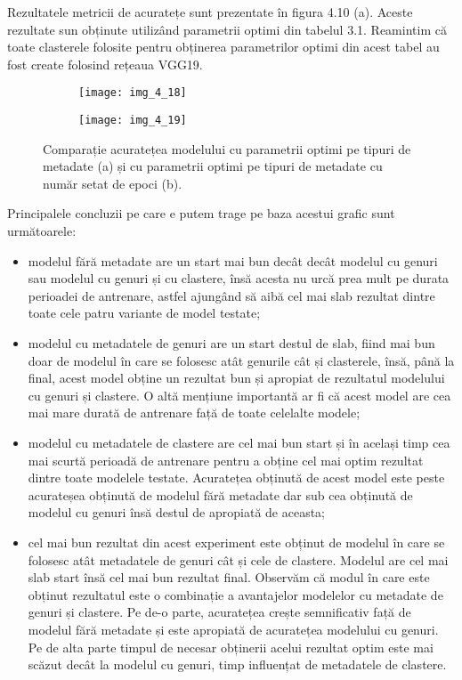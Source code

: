 Rezultatele metricii de acuratețe sunt prezentate în figura 4.10 (a). Aceste rezultate sun obținute utilizând parametrii optimi din tabelul 3.1. Reamintim că toate clasterele folosite pentru obținerea parametrilor optimi din acest tabel au fost create folosind rețeaua VGG19.
\begin{figure}[!tbp]
  \begin{subfigure}[b]{0.5\textwidth}
    \texttt{[image: img\_4\_18]}
    \caption{}
    \label{fig:f1}
  \end{subfigure}
  \hfill
  \begin{subfigure}[b]{0.5\textwidth}
    \texttt{[image: img\_4\_19]}
    \caption{}
    \label{fig:f2}
  \end{subfigure}
  \caption[Comparație acuratețea modelului cu parametrii optimi pe tipuri de metadate]{Comparație acuratețea modelului cu parametrii optimi pe tipuri de metadate (a) și cu parametrii optimi pe tipuri de metadate cu număr setat de epoci (b).}
\end{figure}
Principalele concluzii pe care e putem trage pe baza acestui grafic sunt următoarele:
\begin{itemize}
	\item modelul fără metadate are un start mai bun decât decât modelul cu genuri sau modelul cu genuri și cu clastere, însă acesta nu urcă prea mult pe durata perioadei de antrenare, astfel ajungând să aibă cel mai slab rezultat dintre toate cele patru variante de model testate;
	\item modelul cu metadatele de genuri are un start destul de slab, fiind mai bun doar de modelul în care se folosesc atât genurile cât și clasterele, însă, până la final, acest model obține un rezultat bun și apropiat de rezultatul modelului cu genuri și clastere. O altă mențiune importantă ar fi că acest model are cea mai mare durată de antrenare față de toate celelalte modele;
	\item modelul cu metadatele de clastere are cel mai bun start și în același timp cea mai scurtă perioadă de antrenare pentru a obține cel mai optim rezultat dintre toate modelele testate. Acuratețea obținută de acest model este peste acurateșea obținută de modelul fără metadate dar sub cea obținută de modelul cu genuri însă destul de apropiată de aceasta;
	\item cel mai bun rezultat din acest experiment este obținut de modelul în care se folosesc atât metadatele de genuri cât și cele de clastere. Modelul are cel mai slab start însă cel mai bun rezultat final. Observăm că modul în care este obținut rezultatul este o combinație a avantajelor modelelor cu metadate de genuri și clastere. Pe de-o parte, acuratețea crește semnificativ față de modelul fără metadate și este apropiată de acuratețea modelului cu genuri. Pe de alta parte timpul de necesar obținerii acelui rezultat optim este mai scăzut decât la modelul cu genuri, timp influențat de metadatele de clastere.
\end{itemize}

